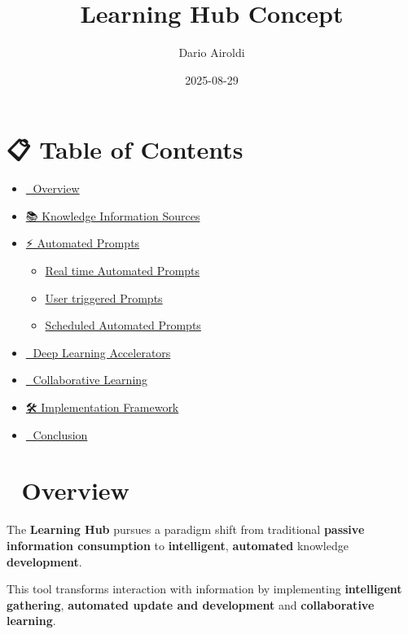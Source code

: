 \documentclass[
  letterpaper,
  DIV=11,
  numbers=noendperiod]{scrartcl}
\title{Learning Hub Concept}
\author{Dario Airoldi}
\date{2025-08-29}
\providecommand{\tightlist}{%
  \setlength{\itemsep}{0pt}\setlength{\parskip}{0pt}}\usepackage{longtable,booktabs,array}
\renewcommand*\contentsname{Table of contents}
\newcommand\contentsname{Table of contents}
\begin{document}
\maketitle

\renewcommand*\contentsname{Table of contents}
{
\hypersetup{linkcolor=}
\setcounter{tocdepth}{3}
\tableofcontents
}

\section{📋 Table of Contents}\label{table-of-contents}

\begin{itemize}
\tightlist
\item
  \hyperref[-overview]{📖 Overview}
\item
  \hyperref[-knowledge-information-sources]{📚 Knowledge Information
  Sources}
\item
  \hyperref[-automated-prompts]{⚡ Automated Prompts}

  \begin{itemize}
  \tightlist
  \item
    \hyperref[real-time-automated-prompts]{Real time Automated Prompts}
  \item
    \hyperref[user-triggered-prompts]{User triggered Prompts}
  \item
    \hyperref[scheduled-automated-prompts]{Scheduled Automated Prompts}
  \end{itemize}
\item
  \hyperref[-deep-learning-accelerators]{🚀 Deep Learning Accelerators}
\item
  \hyperref[-collaborative-learning]{🤝 Collaborative Learning}
\item
  \hyperref[uxfe0f-implementation-framework]{🛠️ Implementation
  Framework}
\item
  \hyperref[-conclusion]{🎯 Conclusion}
\end{itemize}

\section{📖 Overview}\label{overview}

The \textbf{Learning Hub} pursues a paradigm shift from traditional
\textbf{passive information consumption} to \textbf{intelligent},
\textbf{automated} knowledge \textbf{development}.

This tool transforms interaction with information by implementing
\textbf{intelligent gathering}, \textbf{automated update and
development} and \textbf{collaborative learning}.
\end{document}
